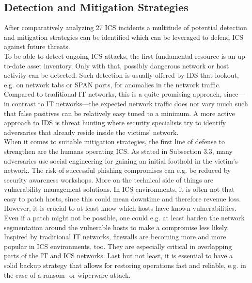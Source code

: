\documentclass[runningheads]{llncs}
\begin{document}
\subsection{Detection and Mitigation Strategies}
After comparatively analyzing 27 ICS incidents a multitude of potential detection and mitigation strategies can be identified which can be leveraged to defend ICS against future threats.\\
To be able to detect ongoing ICS attacks, the first fundamental resource is an up-to-date asset inventory.
Only with that, possibly dangerous network or host activity can be detected.
Such detection is usually offered by IDS that lookout, e.g. on network tabs or SPAN ports, for anomalies in the network traffic.
Compared to traditional IT networks, this is a quite promising approach, since---in contrast to IT networks---the expected network traffic does not vary much such that false positives can be relatively easy tuned to a minimum.
A more active approach to IDS is threat hunting where security specialists try to identify adversaries that already reside inside the victims' network.\\
When it comes to suitable mitigation strategies, the first line of defense to strengthen are the humans operating ICS.
As stated in Subsection 3.3, many adversaries use social engineering for gaining an initial foothold in the victim's network.
The risk of successful phishing compromises can e.g. be reduced by security awareness workshops.
More on the technical side of things are vulnerability management solutions.
In ICS environments, it is often not that easy to patch hosts, since this could mean downtime and therefore revenue loss.
However, it is crucial to at least know which hosts have known vulnerabilities.
Even if a patch might not be possible, one could e.g. at least harden the network segmentation around the vulnerable hosts to make a compromise less likely.
Inspired by traditional IT networks, firewalls are becoming more and more popular in ICS environments, too.
They are especially critical in overlapping parts of the IT and ICS networks.
Last but not least, it is essential to have a solid backup strategy that allows for restoring operations fast and reliable, e.g. in the case of a ransom- or wiperware attack.
\end{document}
